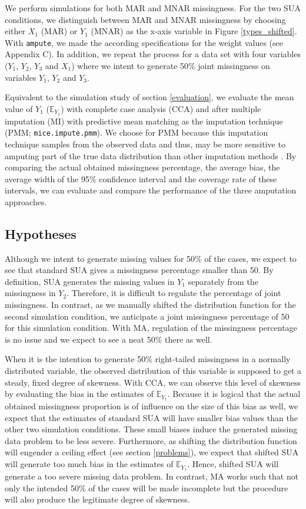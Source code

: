 \documentclass[]{interact}
\newcommand{\code}[1]{\texttt{#1}}
\begin{document}
We perform simulations for both MAR and MNAR missingness. For the two SUA conditions, we distinguish between MAR and MNAR missingness by choosing either $X_1$ (MAR) or $Y_1$ (MNAR) as the x-axis variable in Figure \ref{types_shifted}. With \code{ampute}, we made the according specifications for the weight values (see Appendix C). In addition, we repeat the process for a data set with four variables ($Y_1$, $Y_2$, $Y_3$ and $X_1$) where we intent to generate 50\% joint missingness on variables $Y_1$, $Y_2$ and $Y_3$. 

Equivalent to the simulation study of section \ref{evaluation}, we evaluate the mean value of $Y_1$ ($\mathbb{E}_{Y_1}$) with complete case analysis (CCA) and after multiple imputation (MI) with predictive mean matching as the imputation technique (PMM; \code{mice.impute.pmm}). We choose for PMM because this imputation technique samples from the observed data and thus, may be more sensitive to amputing part of the true data distribution than other imputation methods \citep{Vink2014}. By comparing the actual obtained missingness percentage, the average bias, the average width of the 95\% confidence interval and the coverage rate of these intervals, we can evaluate and compare the performance of the three amputation approaches. 

\subsection{\normalsize Hypotheses}

Although we intent to generate missing values for 50\% of the cases, we expect to see that standard SUA gives a missingness percentage smaller than 50. By definition, SUA generates the missing values in $Y_1$ separately from the missingness in $Y_2$. Therefore, it is difficult to regulate the percentage of joint missingness. In contrast, as we manually shifted the distribution function for the second simulation condition, we anticipate a joint missingness percentage of 50 for this simulation condition. With MA, regulation of the missingness percentage is no issue and we expect to see a neat 50\% there as well. 

When it is the intention to generate 50\% right-tailed missingness in a normally distributed variable, the observed distribution of this variable is supposed to get a steady, fixed degree of skewness. With CCA, we can observe this level of skewness by evaluating the bias in the estimates of $\mathbb{E}_{Y_1}$. Because it is logical that the actual obtained missingness proportion is of influence on the size of this bias as well, we expect that the estimates of standard SUA will have smaller bias values than the other two simulation conditions. These small biases induce the generated missing data problem to be less severe. Furthermore, as shifting the distribution function will engender a ceiling effect (see section \ref{problems}), we expect that shifted SUA will generate too much bias in the estimates of $\mathbb{E}_{Y_1}$. Hence, shifted SUA will generate a too severe missing data problem. In contrast, MA works such that not only the intended 50\% of the cases will be made incomplete but the procedure will also produce the legitimate degree of skewness.
\end{document}
